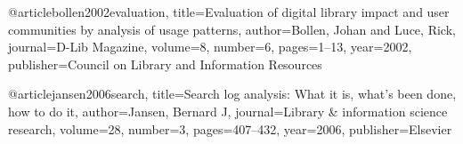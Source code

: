 @article{bollen2002evaluation,
  title={Evaluation of digital library impact and user communities by analysis of usage patterns},
  author={Bollen, Johan and Luce, Rick},
  journal={D-Lib Magazine},
  volume={8},
  number={6},
  pages={1--13},
  year={2002},
  publisher={Council on Library and Information Resources}
}

@article{jansen2006search,
  title={Search log analysis: What it is, what's been done, how to do it},
  author={Jansen, Bernard J},
  journal={Library \& information science research},
  volume={28},
  number={3},
  pages={407--432},
  year={2006},
  publisher={Elsevier}
}
